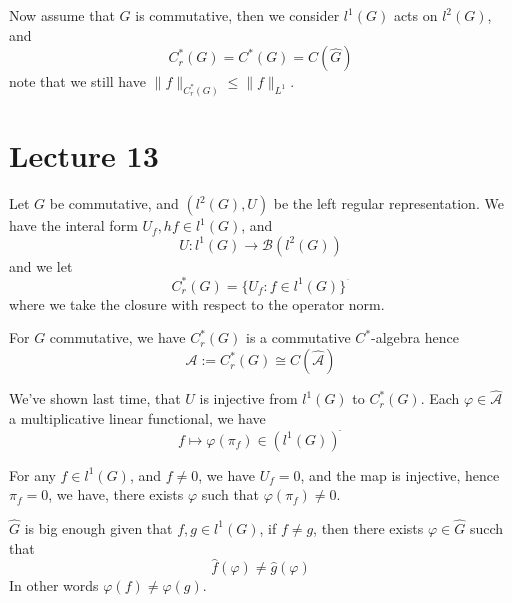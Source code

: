 Now assume that $G$ is commutative, then we consider $l^1(G)$ acts on $l^2(G)$, and 
\begin{equation*}
    C_r^*(G)=C^*(G)=C(\widehat{G})
\end{equation*}
note that we still have $\|f\|_{C_r^*(G)}\leq\|f\|_{L^1}$.

\section{Lecture 13}
Let $G$ be commutative, and $(l^2(G), U)$ be the left regular representation. We have the interal form $U_f, hf\in l^1(G)$, and 
\begin{equation*}
    U: l^1(G)\to \mathcal{B}(l^2(G))
\end{equation*}
and we let
\begin{equation*}
    C_r^*(G)=\{U_f: f\in l^1(G)\}^{\overline{\phantom{.}}}
\end{equation*}
where we take the closure with respect to the operator norm.

For $G$ commutative, we have $C_r^*(G)$ is a commutative $C^*$-algebra hence
\begin{equation*}
    \mathcal{A}:=C_r^*(G)\cong C(\widehat{\mathcal{A}})
\end{equation*}

We've shown last time, that $U$ is injective from $l^1(G)$ to $C_r^*(G)$. Each $\varphi\in\widehat{\mathcal{A}}$ a multiplicative linear functional, we have
\begin{equation*}
    f\mapsto \varphi(\pi_f)\in(l^1(G))^{\widehat{\phantom{.}}}
\end{equation*}

For any $f\in l^1(G)$, and $f\neq 0$, we have $U_f=0$, and the map is injective, hence $\pi_f=0$, we have, there exists $\varphi$ such that $\varphi(\pi_f)\neq 0$.

\begin{corollary}
    $\widehat{G}$ is big enough given that $f,g\in l^1(G)$, if $f\neq g$, then there exists $\varphi\in\widehat{G}$ succh that 
    \begin{equation*}
        \widehat{f}(\varphi)\neq\widehat{g}(\varphi)
    \end{equation*}
    In other words $\varphi(f)\neq\varphi(g)$.
\end{corollary}

